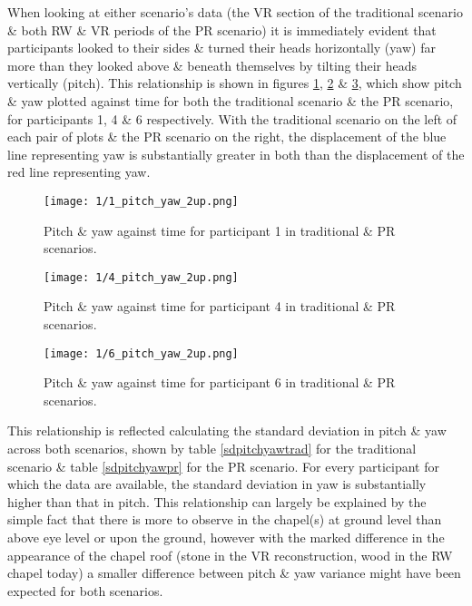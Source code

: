 When looking at either scenario's data (the VR section of the traditional scenario \& both RW \& VR periods of the PR scenario) it is immediately evident that participants looked to their sides \& turned their heads horizontally (yaw) far more than they looked above \& beneath themselves by tilting their heads vertically (pitch). This relationship is shown in figures \ref{1_pitch_yaw_2up.png}, \ref{4_pitch_yaw_2up.png} \& \ref{6_pitch_yaw_2up.png}, which show pitch \& yaw plotted against time for both the traditional scenario \& the PR scenario, for participants 1, 4 \& 6 respectively. With the traditional scenario on the left of each pair of plots \& the PR scenario on the right, the displacement of the blue line representing yaw is substantially greater in both than the displacement of the red line representing yaw.

\begin{figure}
	\begin{center}
	\texttt{[image: 1/1\_pitch\_yaw\_2up.png]}
	\caption{Pitch \& yaw against time for participant 1 in traditional \& PR scenarios.}
	\label{1_pitch_yaw_2up.png}
	\end{center}
\end{figure}

\begin{figure}
	\begin{center}
	\texttt{[image: 1/4\_pitch\_yaw\_2up.png]}
	\caption{Pitch \& yaw against time for participant 4 in traditional \& PR scenarios.}
	\label{4_pitch_yaw_2up.png}
	\end{center}
\end{figure}

\begin{figure}
	\begin{center}
	\texttt{[image: 1/6\_pitch\_yaw\_2up.png]}
	\caption{Pitch \& yaw against time for participant 6 in traditional \& PR scenarios.}
	\label{6_pitch_yaw_2up.png}
	\end{center}
\end{figure}

This relationship is reflected calculating the standard deviation in pitch \& yaw across both scenarios, shown by table \ref{sdpitchyawtrad} for the traditional scenario \& table \ref{sdpitchyawpr} for the PR scenario. For every participant for which the data are available, the standard deviation in yaw is substantially higher than that in pitch. This relationship can largely be explained by the simple fact that there is more to observe in the chapel(s) at ground level than above eye level or upon the ground, however with the marked difference in the appearance of the chapel roof (stone in the VR reconstruction, wood in the RW chapel today) a smaller difference between pitch \& yaw variance might have been expected for both scenarios.

